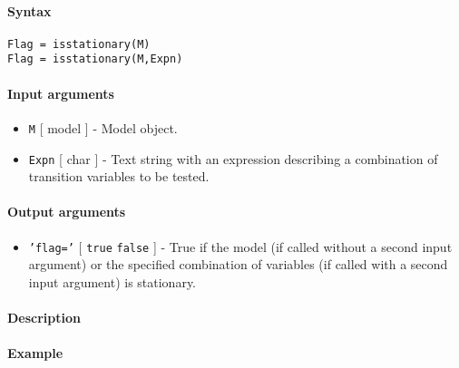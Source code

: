 


	\paragraph{Syntax}

\begin{verbatim}
Flag = isstationary(M)
Flag = isstationary(M,Expn)
\end{verbatim}

\paragraph{Input arguments}

\begin{itemize}
\item
  \texttt{M} {[} model {]} - Model object.
\item
  \texttt{Expn} {[} char {]} - Text string with an expression describing
  a combination of transition variables to be tested.
\end{itemize}

\paragraph{Output arguments}

\begin{itemize}
\itemsep1pt\parskip0pt
\item
  \texttt{'flag='} {[} \texttt{true} \textbar{} \texttt{false} {]} -
  True if the model (if called without a second input argument) or the
  specified combination of variables (if called with a second input
  argument) is stationary.
\end{itemize}

\paragraph{Description}

\paragraph{Example}


